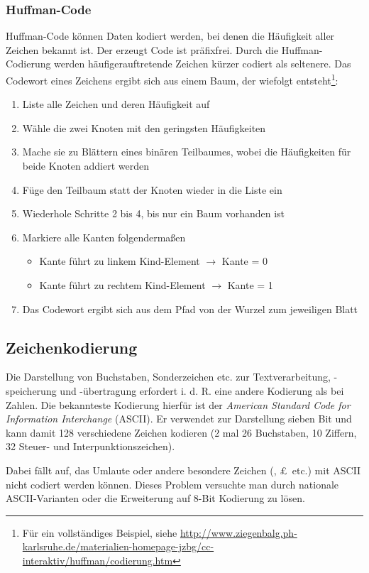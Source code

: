 \documentclass[11pt]{article}
\begin{document}
\subsubsection{Huffman-Code}
Huffman-Code können Daten kodiert werden, bei denen die Häufigkeit aller Zeichen bekannt ist. Der erzeugt Code ist präfixfrei. Durch die Huffman-Codierung werden häufigerauftretende Zeichen kürzer codiert als seltenere. Das Codewort eines Zeichens ergibt sich aus einem Baum, der wiefolgt entsteht\footnote{Für ein vollständiges Beispiel, siehe \url{http://www.ziegenbalg.ph-karlsruhe.de/materialien-homepage-jzbg/cc-interaktiv/huffman/codierung.htm}}:
\begin{enumerate}
\item Liste alle Zeichen und deren Häufigkeit auf
\item Wähle die zwei Knoten mit den geringsten Häufigkeiten
\item Mache sie zu Blättern eines binären Teilbaumes, wobei die Häufigkeiten für beide Knoten addiert werden
\item Füge den Teilbaum statt der Knoten wieder in die Liste ein
\item Wiederhole Schritte 2 bis 4, bis nur ein Baum vorhanden ist
\item Markiere alle Kanten folgendermaßen
  \begin{itemize}
  \item Kante führt zu linkem Kind-Element \(\rightarrow\) Kante = 0
  \item Kante führt zu rechtem Kind-Element \(\rightarrow\) Kante = 1
  \end{itemize}
\item Das Codewort ergibt sich aus dem Pfad von der Wurzel zum jeweiligen Blatt
\end{enumerate}

\subsection{Zeichenkodierung}
Die Darstellung von Buchstaben, Sonderzeichen etc. zur Textverarbeitung, -speicherung und -übertragung erfordert i. d. R. eine andere Kodierung als bei Zahlen. Die bekannteste Kodierung hierfür ist der \textit{American Standard Code for Information Interchange} (ASCII). Er verwendet zur Darstellung sieben Bit und kann damit 128 verschiedene Zeichen kodieren (2 mal 26 Buchstaben, 10 Ziffern, 32 Steuer- und Interpunktionszeichen). 

Dabei fällt auf, das Umlaute oder andere besondere Zeichen (\textquestiondown, \pounds \ etc.) mit ASCII nicht codiert werden können. Dieses Problem versuchte man durch nationale ASCII-Varianten oder die Erweiterung auf 8-Bit Kodierung zu lösen.
\end{document}
